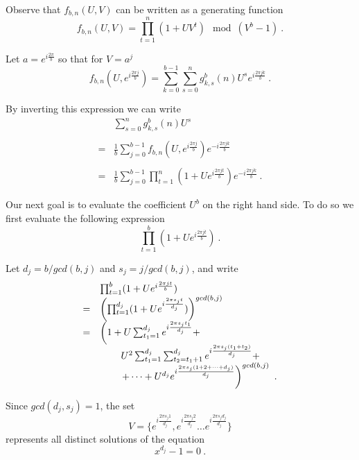 \documentclass[10pt,conference]{IEEEtran}
\begin{document}
Observe that $f_{b,n}(U,V)$ can be written as a generating
function
\begin{equation}\label{eq1a}
f_{b,n}(U,V)= \prod_{t=1}^n (1+UV^t) \mod (V^b-1)~.
\end{equation}


Let $a=e^{i\frac{2\pi }{b}}$ so that for $V=a^j$
\begin{equation}\label{eq1b}
f_{b,n}(U,e^{i\frac{2\pi j}{b}})= \sum_{k=0}^{b-1} \sum_{s=0}^n
g^b_{k,s}(n)U^s e^{i\frac{2\pi jk}{b}}~.
\end{equation}

By inverting this expression we can write
\begin{equation}\label{eq1}
\begin{array}{lll}
&\sum_{s=0}^n g^b_{k,s}(n)U^s \\ \\=& \frac{1}{b}
\sum_{j=0}^{b-1}f_{b,n}(U,e^{i\frac{2\pi j}{b}}) e^{-i\frac{2\pi
jk}{b}}\\ \\=& \frac{1}{b} \sum_{j=0}^{b-1} \prod_{t=1}^n
(1+Ue^{i\frac{2\pi jt}{b}}) e^{-i\frac{2\pi jk}{b}}~.
\end{array}
\end{equation}

Our next goal is to evaluate the coefficient $U^b$ on the right
hand side. To do so we first evaluate the following expression
\begin{equation}
\prod_{t=1}^b (1+Ue^{i\frac{2\pi jt}{b}})~.
\end{equation}

Let $d_j=b/gcd(b,j)$ and $s_j=j/gcd(b,j)$, and write
\begin{equation}
\begin{array}{lll}
{}&\prod_{t=1}^b (1+Ue^{i\frac{2\pi jt}{b}})\\=&
\left(\prod_{t=1}^{d_j} (1+Ue^{i\frac{2\pi
s_j t}{d_j}})\right)^{gcd(b,j)}\\
=& \left( 1+ U\sum_{t_1=1}^{d_j} e^{i\frac{2\pi s_j t_1}{d_j}}+
\right.
\\{}&\hspace{0.3in}U^2\sum_{t_1=1}^{d_j}\sum_{t_2=t_1+1}^{d_j}
e^{i\frac{2\pi s_j(t_1+t_2)}{d_j}} +\\{}&\left.\hspace{0.3in}+\dots
+ U^{d_j} e^{i\frac{2\pi s_j
(1+2+\dots+d_j)}{d_j}}\right)^{gcd(b,j)}~.
\end{array}
\end{equation}


Since $gcd(d_j,s_j)=1$, the set \[V=\{e^{i\frac{2\pi s_j 1}{d_j}},
e^{i\frac{2\pi s_j 2}{d_j}}\dots e^{i\frac{2\pi s_j d_j}{d_j}}\}\]
represents all distinct solutions of the equation
\begin{equation}\label{poly}
x^{d_j}-1=0~.
\end{equation}
\end{document}
